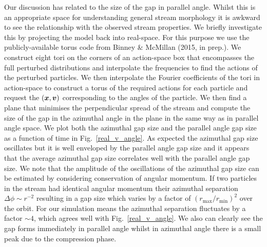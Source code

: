 \documentclass[useAMS,usenatbib,fleqn,a4paper]{mn2e}
\newcommand{\bs}[1]{\bmath{#1}}
\begin{document}
Our discussion has related to the size of the gap in parallel angle. Whilst this is an appropriate space for understanding general stream morphology it is awkward to see the relationship with the observed stream properties. We briefly investigate this by projecting the model back into real-space. For this purpose we use the publicly-available torus code from Binney \& McMillan (2015, in prep.). We construct eight tori on the corners of an action-space box that encompasses the full perturbed distributions and interpolate the frequencies to find the actions of the perturbed particles. We then interpolate the Fourier coefficients of the tori in action-space to construct a torus of the required actions for each particle and request the $(\bs{x},\bs{v})$ corresponding to the angles of the particle. We then find a plane that minimises the perpendicular spread of the stream and compute the size of the gap in the azimuthal angle in the plane in the same way as in parallel angle space. We plot both the azimuthal gap size and the parallel angle gap size as a function of time in Fig.~\ref{real_v_angle}. As expected the azimuthal gap size oscillates but it is well enveloped by the parallel angle gap size and it appears that the average azimuthal gap size correlates well with the parallel angle gap size. We note that the amplitude of the oscillations of the azimuthal gap size can be estimated by considering conservation of angular momentum. If two particles in the stream had identical angular momentum their azimuthal separation $\Delta\phi\sim r^{-2}$ resulting in a gap size which varies by a factor of $(r_\mathrm{max}/r_\mathrm{min})^2$ over the orbit. For our simulation means the azimuthal separation fluctuates by a factor $\sim 4$, which agrees well with Fig.~\ref{real_v_angle}. We also can clearly see the gap forms immediately in parallel angle whilst in azimuthal angle there is a small peak due to the compression phase.
\end{document}
